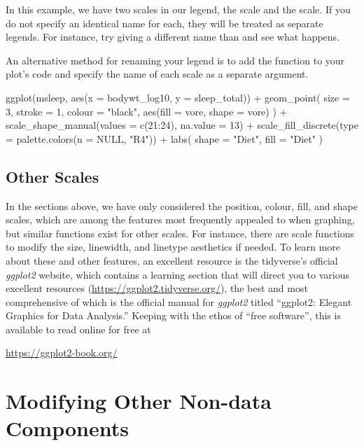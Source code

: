In this example, we have two scales in our legend, the  scale and the  scale.  If you do not specify an identical name for each, they will be treated as separate legends. For instance, try giving  a different name than  and see what happens.

An alternative method for renaming your legend is to add the function  to your plot's code and specify the name of each scale as a separate argument.

\begin{inR}
ggplot(msleep, aes(x = bodywt_log10, y = sleep_total)) +
  geom_point(
    size = 3, stroke = 1, colour = "black",
    aes(fill = vore, shape = vore)
  ) +
  scale_shape_manual(values = c(21:24), na.value = 13) +
  scale_fill_discrete(type = palette.colors(n = NULL, "R4")) +
  labs(
    shape = "Diet",
    fill = "Diet"
  )
\end{inR}

\vspace{1em}

\subsection{Other Scales}

In the sections above, we have only considered the position, colour, fill, and shape scales, which are among the features most frequently appealed to when graphing, but similar functions exist for other scales. For instance, there are scale functions to modify the size, linewidth, and linetype aesthetics if needed. To learn more about these and other features, an excellent resource is the tidyverse's official \textit{ggplot2} website, which contains a learning section that will direct you to various excellent resources (\url{https://ggplot2.tidyverse.org/}), the best and most comprehensive of which is the official manual for \textit{ggplot2} titled ``ggplot2: Elegant Graphics for Data Analysis.'' Keeping with the ethos of ``free software'', this is available to read online for free at 

\begin{center}
\url{https://ggplot2-book.org/}
\end{center}

\section{Modifying Other Non-data Components}

